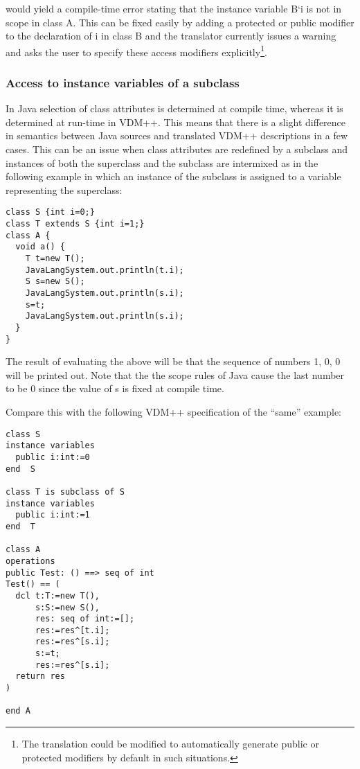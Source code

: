 \documentclass[\pformat,12pt]{article}
\begin{document}
would yield a compile-time error stating that the instance variable B`i is
not in scope in class A. This can be fixed easily by adding a
protected or public modifier to the declaration of i in class B and
the translator currently issues a warning and asks the user to specify
these access modifiers explicitly\footnote{The translation could be
  modified to automatically generate public or protected modifiers by
  default in such situations.}.

\subsubsection{Access to instance variables of a subclass}

In Java selection of class attributes is determined at compile time,
whereas it is determined at run-time in VDM++. This means that there
is a slight difference in semantics between Java sources and
translated VDM++ descriptions in a few cases. This can be an issue when
class attributes are redefined by a subclass and instances of both the
superclass and the subclass are intermixed as in the following
example in which an instance of the subclass is assigned to a variable
representing the superclass:

\begin{small}
\begin{verbatim}
class S {int i=0;}
class T extends S {int i=1;}
class A {
  void a() {
    T t=new T();
    JavaLangSystem.out.println(t.i);  
    S s=new S();
    JavaLangSystem.out.println(s.i);  
    s=t;
    JavaLangSystem.out.println(s.i);  
  }
}
\end{verbatim}
\end{small}

The result of evaluating the above will be that the sequence of
numbers 1, 0, 0 will be printed out. Note that the the scope rules of
Java cause the last number to be 0 since the value of s is fixed at
compile time.

Compare this with the following VDM++ specification of the ``same''
example: 

\begin{small}
\begin{verbatim}
class S
instance variables
  public i:int:=0
end  S

class T is subclass of S
instance variables
  public i:int:=1
end  T

class A
operations
public Test: () ==> seq of int
Test() == (
  dcl t:T:=new T(),
      s:S:=new S(),
      res: seq of int:=[];
      res:=res^[t.i];
      res:=res^[s.i];
      s:=t;
      res:=res^[s.i];
  return res
)

end A
\end{verbatim}
\end{small}
\end{document}
